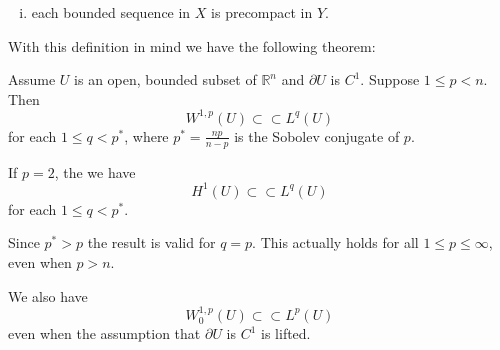 \documentclass[11pt, a4paper]{article}
\begin{document}
\begin{appendices}
\begin{mydef}
\begin{enumerate}[i)]
	\item each bounded sequence in $X$ is precompact in $Y$.
\end{enumerate}
\end{mydef}

With this definition in mind we have the following theorem:
\begin{theorem}
\label{thm:Rellich}
Assume $U$ is an open, bounded subset of $\mathbb{R}^n$ and $\partial U$ is $C^1$.
Suppose $1\leq p < n$. Then
\begin{equation}
\label{Rellich}
W^{1,p}(U) \subset \subset L^q(U)
\end{equation}
for each $1\leq q < p^*$, where $p^* = \frac{np}{n-p}$ is the Sobolev conjugate of $p$.
\end{theorem}
\setcounter{rem}{0}
\begin{rem}
If $p=2$, the we have
\begin{equation*}
H^1(U) \subset \subset L^q(U)
\end{equation*}
for each $1\leq q < p^*$.
\end{rem}
\begin{rem}
Since $p^* > p$ the result is valid for $q=p$. This actually holds for all $1\leq p \leq \infty$, even when $p > n$.
\end{rem}
\begin{rem}
We also have 
\begin{equation*}
W^{1,p}_0(U) \subset \subset L^p(U)
\end{equation*}
even when the assumption that $\partial U$ is $C^1$ is lifted.
\end{rem}


\end{appendices}
\end{document}
